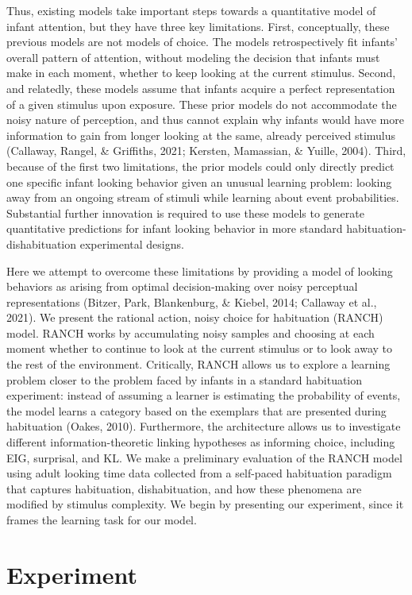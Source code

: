 \documentclass[
  man,floatsintext]{apa6}
\begin{document}
Thus, existing models take important steps towards a quantitative model of infant attention, but they have three key limitations. First, conceptually, these previous models are not models of choice. The models retrospectively fit infants' overall pattern of attention, without modeling the decision that infants must make in each moment, whether to keep looking at the current stimulus. Second, and relatedly, these models assume that infants acquire a perfect representation of a given stimulus upon exposure. These prior models do not accommodate the noisy nature of perception, and thus cannot explain why infants would have more information to gain from longer looking at the same, already perceived stimulus (Callaway, Rangel, \& Griffiths, 2021; Kersten, Mamassian, \& Yuille, 2004). Third, because of the first two limitations, the prior models could only directly predict one specific infant looking behavior given an unusual learning problem: looking away from an ongoing stream of stimuli while learning about event probabilities. Substantial further innovation is required to use these models to generate quantitative predictions for infant looking behavior in more standard habituation-dishabituation experimental designs.

Here we attempt to overcome these limitations by providing a model of looking behaviors as arising from optimal decision-making over noisy perceptual representations (Bitzer, Park, Blankenburg, \& Kiebel, 2014; Callaway et al., 2021). We present the rational action, noisy choice for habituation (RANCH) model. RANCH works by accumulating noisy samples and choosing at each moment whether to continue to look at the current stimulus or to look away to the rest of the environment. Critically, RANCH allows us to explore a learning problem closer to the problem faced by infants in a standard habituation experiment: instead of assuming a learner is estimating the probability of events, the model learns a category based on the exemplars that are presented during habituation (Oakes, 2010). Furthermore, the architecture allows us to investigate different information-theoretic linking hypotheses as informing choice, including EIG, surprisal, and KL. We make a preliminary evaluation of the RANCH model using adult looking time data collected from a self-paced habituation paradigm that captures habituation, dishabituation, and how these phenomena are modified by stimulus complexity. We begin by presenting our experiment, since it frames the learning task for our model.

\hypertarget{experiment}{%
\section{Experiment}\label{experiment}}
\end{document}
